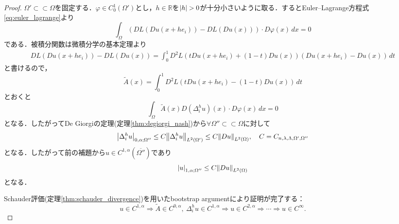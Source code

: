 \documentclass[a4paper]{ltjsarticle}
\newcommand{\Rset}{\mathbb{R}}
\newcommand{\Om}{\Omega}
\newcommand{\ssubset}{\subset\subset}
\newcommand{\1}{\mathbbm{1}}
\numberwithin{equation}{section}
\theoremstyle{definition}
\begin{document}
\begin{proof}
    $\Om'\ssubset \Om$を固定する．$\varphi\in C^1_0(\Om')$とし，$h\in\Rset$を$\abs{h}>0$が十分小さいように取る．するとEuler--Lagrange方程式\eqref{eq:euler_lagrange}より
    \begin{equation}
        \int_{\Om}(DL(Du(x+he_i))-DL(Du(x)))\cdot D\varphi(x)\,dx=0 
    \end{equation}
    である．被積分関数は微積分学の基本定理より
    \begin{align}
        DL(Du(x+he_i))-DL(Du(x))=\int_{0}^{1}D^2L(tDu(x+he_i)+(1-t)Du(x))(Du(x+he_i)-Du(x))\,dt
    \end{align}
    と書けるので，
    \begin{equation}
        \widetilde{A}(x)=\int_{0}^{1}D^2L(tDu(x+he_i)-(1-t)Du(x))\,dt
    \end{equation}
    とおくと
    \begin{equation}
        \int_{\Om}\widetilde{A}(x)D(\Delta^h_iu)(x)\cdot D\varphi(x)\,dx=0
    \end{equation}
    となる．したがってDe Giorgiの定理(定理\ref{thm:degiorgi_nash})から$\forall \Om''\ssubset \Om$に対して
    \begin{equation}
        \abs{\Delta^h_i u}_{0,\alpha;\Om''}\leq C\norm{\Delta^h_i u}_{L^2(\Om')}\leq C\norm{Du}_{L^2(\Om )},\quad C=C_{n,\lambda,\Lambda,\Om',\Om''}
    \end{equation}
    となる．したがって前の補題から$u\in C^{1,\alpha}(\overline{\Om''})$であり
    \begin{equation}
        \abs{u}_{1,\alpha;\Om''}\leq C\norm{Du}_{L^2(\Om)}
    \end{equation}
    となる．

    Schauder評価(定理\ref{thm:schauder_divergence})を用いたbootstrap argumentにより証明が完了する：
    \begin{equation}
        u\in C^{1,\alpha}\Rightarrow \widetilde{A}\in C^{0,\alpha},\ \Delta^h_i u\in C^{1,\alpha}\Rightarrow u\in C^{2,\alpha}\Rightarrow \cdots\Rightarrow u\in C^{\infty}. 
    \end{equation}
\end{proof}
\end{document}
